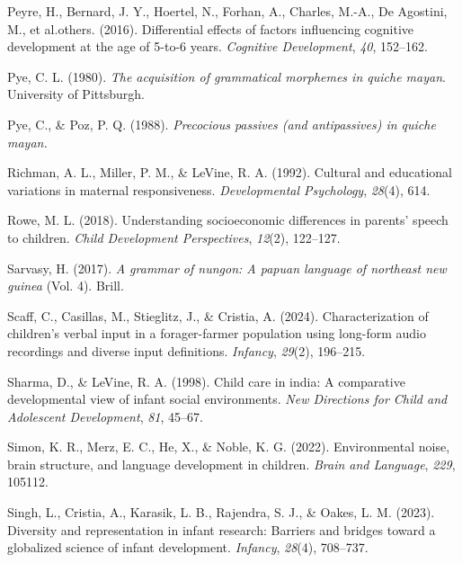 \documentclass[
  man,floatsintext]{apa6}
\newlength{\cslhangindent}
\newlength{\cslentryspacingunit} %
\newenvironment{CSLReferences}[2] %
 {%
  \setlength{\parindent}{0pt}
  \ifodd #1
  \let\oldpar\par
  \def\par{\hangindent=\cslhangindent\oldpar}
  \fi
  \setlength{\parskip}{#2\cslentryspacingunit}
 }%
 {}
\begin{document}
\begin{CSLReferences}{1}{0}
\leavevmode{}%
Peyre, H., Bernard, J. Y., Hoertel, N., Forhan, A., Charles, M.-A., De Agostini, M., et al.others. (2016). Differential effects of factors influencing cognitive development at the age of 5-to-6 years. \emph{Cognitive Development}, \emph{40}, 152--162.

\leavevmode{}%
Pye, C. L. (1980). \emph{The acquisition of grammatical morphemes in quiche mayan}. University of Pittsburgh.

\leavevmode{}%
Pye, C., \& Poz, P. Q. (1988). \emph{Precocious passives (and antipassives) in quiche mayan.}

\leavevmode{}%
Richman, A. L., Miller, P. M., \& LeVine, R. A. (1992). Cultural and educational variations in maternal responsiveness. \emph{Developmental Psychology}, \emph{28}(4), 614.

\leavevmode{}%
Rowe, M. L. (2018). Understanding socioeconomic differences in parents' speech to children. \emph{Child Development Perspectives}, \emph{12}(2), 122--127.

\leavevmode{}%
Sarvasy, H. (2017). \emph{A grammar of nungon: A papuan language of northeast new guinea} (Vol. 4). Brill.

\leavevmode{}%
Scaff, C., Casillas, M., Stieglitz, J., \& Cristia, A. (2024). Characterization of children's verbal input in a forager-farmer population using long-form audio recordings and diverse input definitions. \emph{Infancy}, \emph{29}(2), 196--215.

\leavevmode{}%
Sharma, D., \& LeVine, R. A. (1998). Child care in india: A comparative developmental view of infant social environments. \emph{New Directions for Child and Adolescent Development}, \emph{81}, 45--67.

\leavevmode{}%
Simon, K. R., Merz, E. C., He, X., \& Noble, K. G. (2022). Environmental noise, brain structure, and language development in children. \emph{Brain and Language}, \emph{229}, 105112.

\leavevmode{}%
Singh, L., Cristia, A., Karasik, L. B., Rajendra, S. J., \& Oakes, L. M. (2023). Diversity and representation in infant research: Barriers and bridges toward a globalized science of infant development. \emph{Infancy}, \emph{28}(4), 708--737.


\end{CSLReferences}
\end{document}
